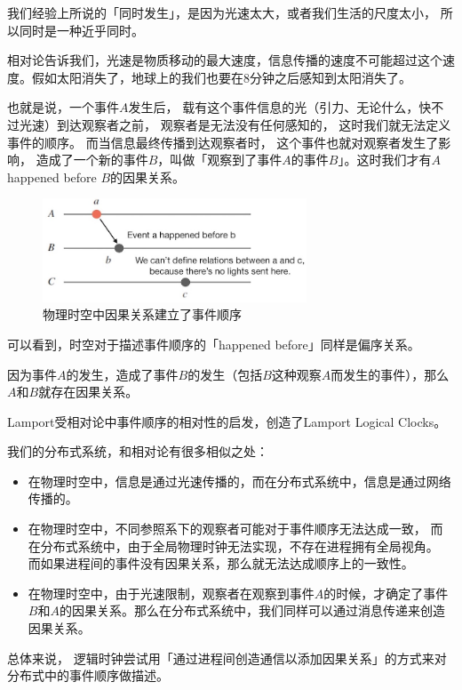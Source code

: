 \documentclass[cn,11pt,chinese]{elegantbook}
\begin{document}
我们经验上所说的「同时发生」，是因为光速太大，或者我们生活的尺度太小， 所以同时是一种近乎同时。

相对论告诉我们，光速是物质移动的最大速度，信息传播的速度不可能超过这个速度。假如太阳消失了，地球上的我们也要在8分钟之后感知到太阳消失了。

也就是说，一个事件$A$发生后， 载有这个事件信息的光（引力、无论什么，快不过光速）到达观察者之前， 观察者是无法没有任何感知的， 这时我们就无法定义事件的顺序。 而当信息最终传播到达观察者时， 这个事件也就对观察者发生了影响， 造成了一个新的事件$B$，叫做「观察到了事件$A$的事件$B$」。这时我们才有$A$ happened before $B$的因果关系。

\begin{figure}
    \centering
    \includegraphics[width=0.7\textwidth]{images/appendix-a-07.jpeg}
    \caption{物理时空中因果关系建立了事件顺序}
\end{figure}

可以看到，时空对于描述事件顺序的「happened before」同样是偏序关系。

因为事件$A$的发生，造成了事件$B$的发生（包括$B$这种观察$A$而发生的事件），那么$A$和$B$就存在因果关系。

Lamport受相对论中事件顺序的相对性的启发，创造了Lamport Logical Clocks。

我们的分布式系统，和相对论有很多相似之处：

\begin{itemize}
    \item 在物理时空中，信息是通过光速传播的，而在分布式系统中，信息是通过网络传播的。
    \item 在物理时空中，不同参照系下的观察者可能对于事件顺序无法达成一致， 而在分布式系统中，由于全局物理时钟无法实现，不存在进程拥有全局视角。 而如果进程间的事件没有因果关系，那么就无法达成顺序上的一致性。
    \item 在物理时空中，由于光速限制，观察者在观察到事件$A$的时候，才确定了事件$B$和$A$的因果关系。那么在分布式系统中，我们同样可以通过消息传递来创造因果关系。
\end{itemize}

总体来说， 逻辑时钟尝试用「通过进程间创造通信以添加因果关系」的方式来对分布式中的事件顺序做描述。
\end{document}
